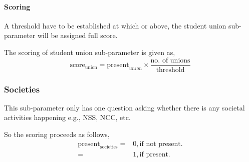 \documentclass[oneside,twocolumn]{article}
\begin{document}
\paragraph{Scoring}
A threshold have to be established at which or above,
the student union sub-parameter will be assigned full
score.

The scoring of student union sub-parameter is given as,
\[
\text{score}_{\text{union}} = \text{present}_{union} \times 
\dfrac{\text{no. of unions}}{\text{threshold}}
\]

\subsubsection{Societies}
This sub-parameter only has one question asking whether
there is any societal activities happening e.g., NSS, NCC, etc.

So the scoring proceeds as follows,
\begin{align*}
  \text{present}_{\text{societies}} =& 0, \text{if not present.} \\
  =& 1, \text{if present.}
\end{align*}
\end{document}
